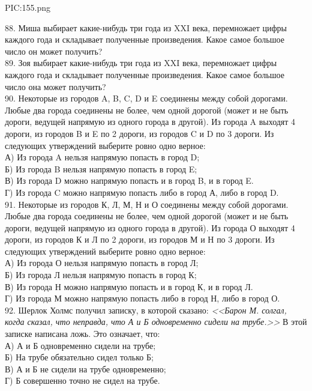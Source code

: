 \begin{center}
{{PIC:155.png}}
\end{center}
88. Миша выбирает какие-нибудь три года из XXI века, перемножает цифры каждого года и складывает полученные произведения. Какое самое большое число он может получить?\\
89. Зоя выбирает какие-нибудь три года из XXI века, перемножает цифры каждого года и складывает полученные произведения. Какое самое большое число она может получить?\\
90. Некоторые из городов A, B, C, D и E соединены между собой дорогами. Любые два города соединены не более, чем одной дорогой (может и не быть дороги, ведущей напрямую из одного города в другой). Из города A выходят 4 дороги, из городов B и E по 2 дороги, из городов C и D по 3 дороги. Из следующих утверждений выберите ровно одно верное:\\
А) Из города A нельзя напрямую попасть в город D;\\
Б) Из города B нельзя напрямую попасть в город E;\\
В) Из города D можно напрямую попасть и в город B, и в город E.\\
Г) Из города C можно напрямую попасть либо в город А, либо в город D.\\
91. Некоторые из городов К, Л, М, Н и О соединены между собой дорогами. Любые два города соединены не более, чем одной дорогой (может и не быть дороги, ведущей напрямую из одного города в другой). Из города О выходят 4 дороги, из городов К и Л по 2 дороги, из городов М и Н по 3 дороги. Из следующих утверждений выберите ровно одно верное:\\
А) Из города О нельзя напрямую попасть в город Л;\\
Б) Из города Л нельзя напрямую попасть в город К;\\
В) Из города Н можно напрямую попасть и в город К, и в город Л.\\
Г) Из города М можно напрямую попасть либо в город Н, либо в город О.\\
92. Шерлок Холмс получил записку, в которой сказано: {\it <<Барон М. солгал, когда сказал, что неправда, что А и Б одновременно сидели на трубе.>>} В этой записке написана ложь. Это означает, что:\\
А) А и Б одновременно сидели на трубе;\\
Б) На трубе обязательно сидел только Б;\\
В) А и Б не сидели на трубе одновременно;\\
Г) Б совершенно точно не сидел на трубе.\\
